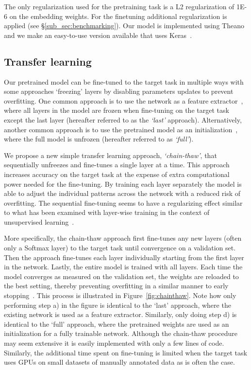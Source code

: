 \documentclass[11pt,a4paper]{article}
\begin{document}
The only regularization used for the pretraining task is a L2 regularization of \num{1E-6} on the embedding weights. For the finetuning additional regularization is applied (see \S\ref{sub_sec:benchmarking}). Our model is implemented using Theano~\cite{theano} and we make an easy-to-use version available that uses Keras~\cite{chollet2015keras}. 


\subsection{Transfer learning}
\label{sub_sec:transfer_learning}

Our pretrained model can be fine-tuned to the target task in multiple ways with some approaches `freezing' layers by disabling parameters updates to prevent overfitting. One common approach is to use the network as a feature extractor~\cite{donahue2014decaf}, where all layers in the model are frozen when fine-tuning on the target task except the last layer (hereafter referred to as the \textit{`last'} approach). Alternatively, another common approach is to use the pretrained model as an initialization~\cite{erhan2010does}, where the full model is unfrozen (hereafter referred to as \textit{`full'}).

We propose a new simple transfer learning approach, \textit{`chain-thaw'}, that sequentially unfreezes and fine-tunes a single layer at a time. This approach increases accuracy on the target task at the expense of extra computational power needed for the fine-tuning. By training each layer separately the model is able to adjust the individual patterns across the network with a reduced risk of overfitting. The sequential fine-tuning seems to have a regularizing effect similar to what has been examined with layer-wise training in the context of unsupervised learning~\cite{erhan2010does}.

More specifically, the chain-thaw approach first fine-tunes any new layers (often only a Softmax layer) to the target task until convergence on a validation set. Then the approach fine-tunes each layer individually starting from the first layer in the network. Lastly, the entire model is trained with all layers. Each time the model converges as measured on the validation set, the weights are reloaded to the best setting, thereby preventing overfitting in a similar manner to early stopping~\cite{sjoberg1995overtraining}. This process is illustrated in Figure~\ref{fig:chainthaw}. Note how only performing step a) in the figure is identical to the `last' approach, where the existing network is used as a feature extractor. Similarly, only doing step d) is identical to the `full' approach, where the pretrained weights are used as an initialization for a fully trainable network. Although the chain-thaw procedure may seem extensive it is easily implemented with only a few lines of code. Similarly, the additional time spent on fine-tuning is limited when the target task uses GPUs on small datasets of manually annotated data as is often the case.
\end{document}
